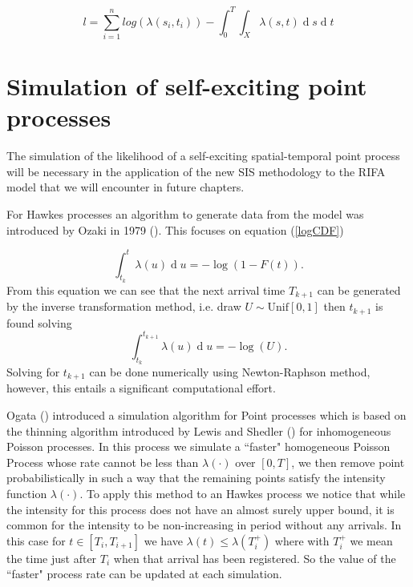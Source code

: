 \documentclass[11pt,a4paper]{article}
\renewcommand{\d}[1]{\ensuremath{\operatorname{d}\!{#1}}}
\begin{document}
\begin{equation*}
    l = \sum_{i=1}^n log(\lambda(s_i, t_i)) - \int_0^T\int_X \lambda(s,t) \d s \d t
\end{equation*}

\section{Simulation of self-exciting point processes}

The simulation of the likelihood of a self-exciting spatial-temporal point process will be necessary in the application of the new SIS methodology to the RIFA model that we will encounter in future chapters.

For Hawkes processes an algorithm to generate data from the model was introduced by Ozaki in 1979 (\cite{Ozaki}). This focuses on equation (\ref{logCDF})

\begin{equation*}
    \int_{t_k}^t \lambda (u) \d u = - \log(1 - F(t)).
\end{equation*}
From this equation we can see that the next arrival time $T_{k+1}$ can be generated by the inverse transformation method, i.e. draw $U \sim \text{Unif}[0, 1]$ then $t_{k+1}$ is found solving 
\begin{equation*}
    \int_{t_k}^{t_{k+1}} \lambda(u) \d u = - \log (U).
\end{equation*}
Solving for $t_{k+1}$ can be done numerically using Newton-Raphson method, however, this entails a significant computational effort.

Ogata (\cite{Ogata81}) introduced a simulation algorithm for Point processes which is based on the thinning algorithm introduced by Lewis and Shedler (\cite{Lewis}) for inhomogeneous Poisson processes. In this process we simulate a ``faster" homogeneous Poisson Process whose rate cannot be less than $\lambda(\cdot)$ over $[0,T]$,  we then remove point probabilistically in such a way that the remaining points satisfy the intensity function $\lambda(\cdot)$.
To apply this method to an Hawkes process we notice that while the intensity for this process does not have an almost surely upper bound, it is common for the intensity to be non-increasing in period without any arrivals. In this case for $t \in [T_i, T_{i+1}]$ we have $\lambda(t) \leq \lambda (T^+_i)$ where with $T^+_i$ we mean the time just after $T_i$ when that arrival has been registered. So the value of the ``faster" process rate can be updated at each simulation.
\end{document}
